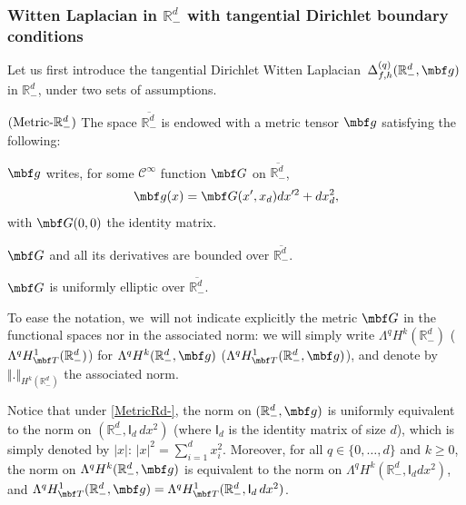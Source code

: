 \subsubsection{Witten Laplacian in $\mathbb R^d_-$ with tangential
Dirichlet boundary conditions}\label{sec.Rdmoins_main}
Let us first introduce the tangential
Dirichlet Witten
Laplacian~$\Delta_{f,h}^{(q)} (\mathbb R^d_-,\mbf g)$ in $ \mathbb
R^d_-$, under two sets of assumptions.

\begin{manualassumption}{$(\textup{Metric-}\mathbb R^{d}_-)$}\label{MetricRd-}
The space $\overline{\mathbb R^d_-}$ is endowed with a metric
tensor $\mbf g$ satisfying the following:
\begin{enumeratei}
\item\label{MetricRd-i}
$\mbf g$ writes, for some $\mathcal C^\infty$ function
$\mbf G$ on $\overline{\mathbb R^d_-}$,
\begin{equation}\label{eq.outc2}
\mbf g(x) = {\mbf G}(x',x_d)dx'^2+dx_d^2,
\end{equation}
with ${\mbf G}(0,0)$ the identity matrix.
\item\label{MetricRd-ii}
${\mbf G}$ and all its derivatives are bounded over $\overline{\mathbb R^d_-}$.
\item\label{MetricRd-iii}
${\mbf G}$ is uniformly elliptic over $\overline{\mathbb R^d_-}$.
\end{enumeratei}
\end{manualassumption}

To ease the notation, we~will not indicate explicitly the metric ${\mbf G}$ in the
functional spaces nor in the associated norm: we will simply write $ \Lambda^qH^k(\mathbb
R^{d}_-)$ (\resp $\Lambda^qH^1_{\mbf T}(\mathbb R^d_-)$) for
$\Lambda^qH^k(\mathbb R^{d}_-,\mbf g)$ (\resp $\Lambda^qH^1_{\mbf
T}(\mathbb R^d_-,\mbf g)$), and denote by $ \Vert. \Vert_{H^k(\mathbb R^{d}_-)}$ the associated norm.

Notice that under \ref{MetricRd-}, the norm on $(\mathbb R^d_-,
\mbf g)$ is uniformly equivalent to the norm on $(\mathbb R^d_-,
\mathsf I_{d} \, dx^2)$ (where
$\mathsf I_{d}$ is the identity matrix of size $d$), which is simply denoted by $\vert x \vert$: $\vert x\vert^2=\sum_{i=1}^{d}x_i^2$.
Moreover, for all $q\in \{0,\ldots,d\}$ and $k\ge 0$, the norm on $\Lambda^qH^k(\mathbb R^d_-,\mbf g)$ is equivalent to the norm on $\Lambda^qH^k(\mathbb R^d_-, \mathsf I_d dx^2)$, and
$\Lambda^qH^1_{\mbf T}(\mathbb R^d_-,\mbf g)=\Lambda^qH^1_{\mbf T}(\mathbb R^d_-, \mathsf I_{d} \, dx^2)$.

